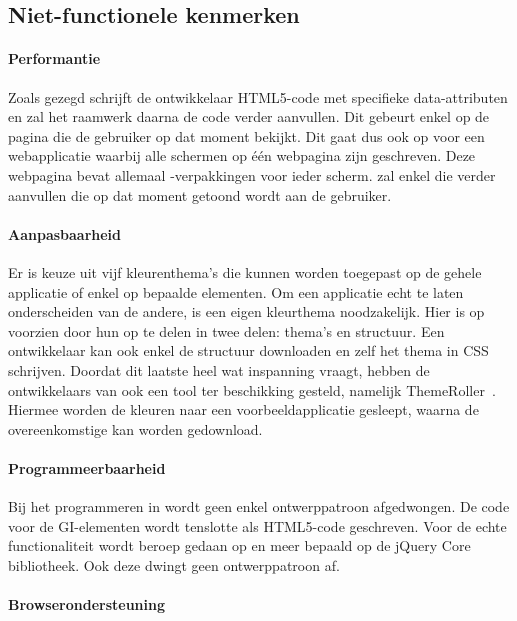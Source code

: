 \subsection{Niet-functionele kenmerken}
\paragraph{Performantie}
Zoals gezegd schrijft de ontwikkelaar HTML5-code met specifieke data-attributen en zal het raamwerk daarna de code verder aanvullen. 
Dit gebeurt enkel op de pagina die de gebruiker op dat moment bekijkt. 
Dit gaat dus ook op voor een webapplicatie waarbij alle schermen op één webpagina zijn geschreven. 
Deze webpagina bevat allemaal -verpakkingen voor ieder scherm. 
\jqm{} zal enkel die  verder aanvullen die op dat moment getoond wordt aan de gebruiker. 

\paragraph{Aanpasbaarheid}
Er is keuze uit vijf kleurenthema's die kunnen worden toegepast op de gehele applicatie of enkel op bepaalde elementen. 
Om een applicatie echt te laten onderscheiden van de andere, is een eigen kleurthema noodzakelijk. 
Hier is \jqm{} op voorzien door hun  op te delen in twee delen: thema's en structuur. 
Een ontwikkelaar kan ook enkel de structuur downloaden en zelf het thema in CSS schrijven. 
Doordat dit laatste heel wat inspanning vraagt, hebben de ontwikkelaars van \jqm{} ook een tool ter beschikking gesteld, namelijk ThemeRoller~\cite{JQuery2012c}. 
Hiermee worden de kleuren naar een voorbeeldapplicatie gesleept, waarna de overeenkomstige  kan worden gedownload.

\paragraph{Programmeerbaarheid}
Bij het programmeren in \jqm{} wordt geen enkel ontwerppatroon afgedwongen. 
De code voor de GI-elementen wordt tenslotte als HTML5-code geschreven. 
Voor de echte functionaliteit wordt beroep gedaan op \js{} en meer bepaald op de jQuery Core bibliotheek. 
Ook deze dwingt geen ontwerppatroon af.

\paragraph{Browserondersteuning}
\label{sec:jqm-browser-support}


